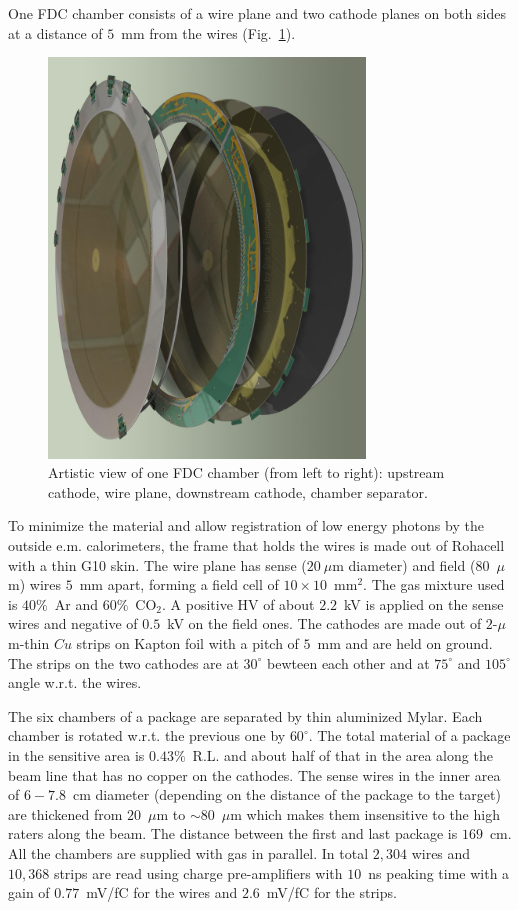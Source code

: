 One FDC chamber consists of a wire plane and two cathode planes on both sides at a distance of $5$~mm from the wires (Fig.~\ref{FDC_OneCell}).
\begin{figure}[tbp]
\begin{center}
\includegraphics[width=0.75\textwidth]{figures/FDC_OneCell.jpg}  
\caption{\label{FDC_OneCell}
Artistic view of one FDC chamber (from left to right): upstream cathode, wire plane, downstream cathode, chamber separator.
}
\end{center}
\end{figure}
To minimize the material and allow registration of low energy photons by the outside e.m. calorimeters,
the frame that holds the wires is made out of Rohacell with a thin G10 skin.
The wire plane has sense ($20~\mu$m diameter) and field ($80$~$\mu$m) wires $5$~mm apart, forming a field cell of $10\times 10$~mm$^2$. 
The gas mixture used is $40\%$~Ar and $60\%$~CO$_2$.
A positive HV of about $2.2$~kV is applied on the sense wires and negative of $0.5$~kV on the field ones. 
The cathodes are made out of $2$-$\mu$m-thin $Cu$ strips on Kapton foil with a pitch of $5$~mm and are held on ground. The strips on the two cathodes are at $30^\circ $ bewteen each other and at $75^\circ $ and $105^\circ $ angle w.r.t. the wires.

The six chambers of a package are separated by thin aluminized Mylar.
Each chamber is rotated w.r.t. the previous one by $60^\circ $.
The total material of a package in the sensitive area is $0.43\%$~R.L. and about half of that in the area along the beam line that has no copper on the cathodes.
The sense wires in the inner area of $6-7.8$~cm diameter (depending on the distance of the package to the target) are thickened from $20$~$\mu$m to $\sim 80$~$\mu$m which makes them insensitive to the high raters along the beam.
The distance between the first and last package is $169$~cm. 
All the chambers are supplied with gas in parallel. 
In total $2,304$ wires and $10,368$ strips are read using charge pre-amplifiers with $10$~ns peaking time with a gain of $0.77$~mV/fC for the wires and $2.6$~mV/fC for the strips.

